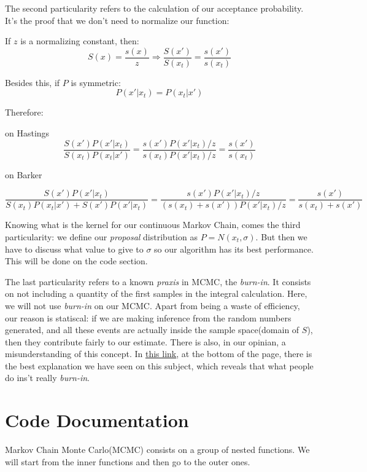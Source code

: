 \documentclass{article}
\begin{document}
The second particularity refers to the calculation of our acceptance probability. It's the proof that we don't need to normalize our function:

\vspace{.5cm}

If $z$ is a normalizing constant, then:
$$S(x) = \frac{s(x)}{z} \Rightarrow \frac{S(x')}{S(x_t)} = \frac{s(x')}{s(x_t)}$$

Besides this, if $P$ is symmetric:
$$P(x'|x_t) = P(x_t|x')$$

Therefore:

on Hastings
$$\frac{S(x')P(x'|x_t)}{S(x_t)P(x_t|x')} = \frac{s(x')P(x'|x_t)/z}{s(x_t)P(x'|x_t)/z} = \frac{s(x')}{s(x_t)}$$

on Barker

$$\frac{S(x')P(x'|x_t)}{S(x_t)P(x_t|x') + S(x')P(x'|x_t)} = \frac{s(x')P(x'|x_t)/z}{(s(x_t) + s(x'))P(x'|x_t)/z} = \frac{s(x')}{s(x_t) + s(x')}$$

\vspace{.5cm}

Knowing what is the kernel for our continuous Markov Chain, comes the third particularity: we define our \textit{proposal} distribution as $P = N(x_t, \sigma)$. But then we have to discuss what value to give to $\sigma$ so our algorithm has its best performance. This will be done on the code section.

The last particularity refers to a known \textit{praxis} in MCMC, the \textit{burn-in}. It consists on not including a quantity of the first samples in the integral calculation. Here, we will not use \textit{burn-in} on our MCMC. Apart from being a waste of efficiency, our reason is statiscal: if we are making inference from the random numbers generated, and all these events are actually inside the sample space(domain of $S$), then they contribute fairly to our estimate. There is also, in our opinian, a misunderstanding of this concept. In \href{https://support.sas.com/documentation/cdl/en/statug/63033/HTML/default/viewer.htm#statug_introbayes_sect007.htm}{this link}, at the bottom of the page, there is the best explanation we have seen on this subject, which reveals that what people do ins't really \textit{burn-in}.

\section{Code Documentation}

Markov Chain Monte Carlo(MCMC) consists on a group of nested functions. We will start from the inner functions and then go to the outer ones. 
\end{document}
